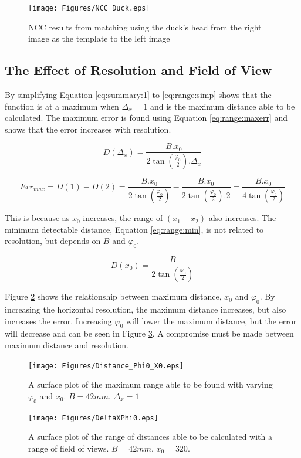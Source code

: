 \begin{figure}
\texttt{[image: Figures/NCC\_Duck.eps]}
\caption{NCC results from matching using the duck's head from the right image as the template to the left image}
\label{fig:duck:ncc}
\end{figure}


\subsection{The Effect of Resolution and Field of View}

By simplifying Equation \eqref{eq:summary:1} to \eqref{eq:range:simp} shows that the function is at a maximum when $\Delta_x = 1$ and is the maximum distance able to be calculated. The maximum error is found using Equation \eqref{eq:range:maxerr} and shows that the error increases with resolution. 

\begin{equation}\label{eq:range:simp}
D(\Delta_x) = \frac{B.x_0}{2\tan \left(\frac{\varphi_0}{2}\right).\Delta_x}
\end{equation}

\begin{equation}\label{eq:range:maxerr}
Err_{max} = D(1) - D(2) = \frac{B.x_0}{2\tan \left(\frac{\varphi_0}{2}\right)} - \frac{B.x_0}{2\tan \left(\frac{\varphi_0}{2}\right).2} = \frac{B.x_0}{4\tan \left(\frac{\varphi_0}{2}\right)}
\end{equation}

This is because as $x_0$ increases, the range of $(x_1 - x_2)$ also increases. The minimum detectable distance, Equation \eqref{eq:range:min}, is not related to resolution, but depends on $B$ and $\varphi_0$. 

\begin{equation}\label{eq:range:min}
D(x_0) = \frac{B}{2\tan \left(\frac{\varphi_0}{2}\right)}
\end{equation}

Figure \ref{fig:MaxR} shows the relationship between maximum distance, $x_0$ and $\varphi_0$. By increasing the horizontal resolution, the maximum distance increases, but also increases the error. Increasing $\varphi_0$ will lower the maximum distance, but the error will decrease and can be seen in Figure \ref{fig:DeltaxPhi0}. A compromise must be made between maximum distance and resolution. 

\begin{figure}
\texttt{[image: Figures/Distance\_Phi0\_X0.eps]}
\caption{A surface plot of the maximum range able to be found with varying $\varphi_0$ and $x_0$. $B=42mm$, $\Delta_x = 1$}
\label{fig:MaxR}
\end{figure}
\begin{figure}
\texttt{[image: Figures/DeltaXPhi0.eps]}
\caption{A surface plot of the range of distances able to be calculated with a range of field of views. $B=42mm$, $x_0 = 320$.}
\label{fig:DeltaxPhi0}
\end{figure}

